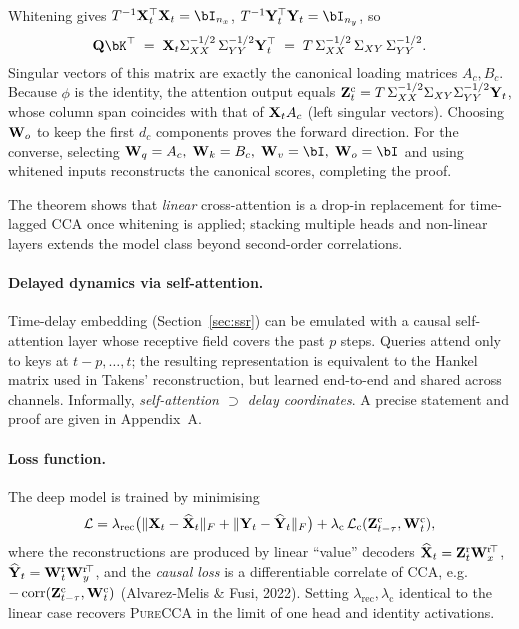 \documentclass[14pt]{extarticle}
\begin{document}
	\begin{Proof}
		Whitening gives
		\(T^{-1}\bX_t^\top\bX_t=\bI_{n_x}\),
		\(T^{-1}\bY_t^\top\bY_t=\bI_{n_y}\),
		so
		\[
		\bQ\bK^\top \;=\;
		\bX_t\Sigma_{XX}^{-1/2}\,\Sigma_{YY}^{-1/2}\bY_t^\top
		\;=\;T\,\Sigma_{XX}^{-1/2}\,\Sigma_{XY}\,\Sigma_{YY}^{-1/2}.
		\]
		Singular vectors of this matrix are exactly the canonical loading
		matrices \(A_c,B_c\).
		Because \(\phi\) is the identity, the attention output equals
		\(\mathbf{Z}_t^{\mathrm c}=T\,\Sigma_{XX}^{-1/2}\Sigma_{XY}\Sigma_{YY}^{-1/2}\mathbf{Y}_t\),
		whose column span coincides with that of
		\(\mathbf{X}_tA_c\) (left singular vectors).
		Choosing \(\mathbf{W}_o\) to keep the first \(d_c\) components proves the forward
		direction.
		For the converse, selecting
		\(\bW_q=A_c,\;\bW_k=B_c,\;\bW_v=\bI,\;\bW_o=\bI\)
		and using whitened inputs reconstructs the canonical scores, completing
		the proof.
	\end{Proof}
	
	The theorem shows that \emph{linear} cross-attention is a drop-in
	replacement for time-lagged CCA once whitening is applied; stacking
	multiple heads and non-linear layers extends the model class beyond
	second-order correlations.
	
	\paragraph{Delayed dynamics via self-attention.}
	Time-delay embedding (Section~\ref{sec:ssr}) can be emulated with a causal
	self-attention layer whose receptive field covers the past
	$p$ steps.
	Queries attend only to keys at \(t-p,\dots,t\); the resulting representation
	is equivalent to the Hankel matrix used in Takens’ reconstruction,
	but learned end-to-end and shared across channels.
	Informally, \emph{self-attention \(\supset\) delay coordinates}.
	A precise statement and proof are given in Appendix~A.
	
	\paragraph{Loss function.}
	The deep model is trained by minimising
	\[
	\mathcal L
	=
	\lambda_{\mathrm{rec}}
	\bigl(
	\|\mathbf{X}_t-\widehat{\mathbf{X}}_t\|_F
	+
	\|\mathbf{Y}_t-\widehat{\mathbf{Y}}_t\|_F
	\bigr)
	+
	\lambda_{\mathrm{c}}
	\,\mathcal L_{\mathrm{c}}(\mathbf{Z}_{t-\tau}^{\mathrm c},\mathbf{W}_t^{\mathrm c}),
	\]
	where the reconstructions are produced by linear “value” decoders
	\(\widehat{\mathbf{X}}_t=\mathbf{Z}_t^{\mathrm r}\mathbf{W}_{x}^{\mathrm r\!\top}\),
	\(\widehat{\mathbf{Y}}_t=\mathbf{W}_t^{\mathrm r}\mathbf{W}_{y}^{\mathrm r\!\top}\),
	and the \emph{causal loss} is a differentiable correlate of CCA,
	e.g.\ \(-\operatorname{corr}(\mathbf{Z}_{t-\tau}^{\mathrm c},\mathbf{W}_t^{\mathrm c})\)
	(Alvarez‐Melis \& Fusi, 2022).
	Setting \(\lambda_{\mathrm{rec}},\lambda_{\mathrm{c}}\) identical to the
	linear case recovers \textsc{PureCCA} in the limit of one head and
	identity activations.
	
\end{document}
